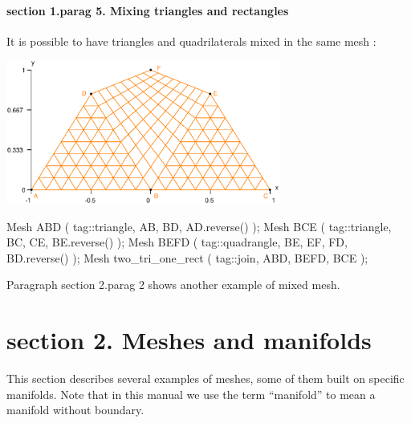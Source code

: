 \paragraph{\numb section 1.\numb parag 5. Mixing triangles and rectangles}

It is possible to have triangles and quadrilaterals mixed in the same mesh :

{ 
\centerline{\includegraphics[width=9cm]{two-tri-one-rect.eps}} }

\verbatim
   Mesh ABD ( tag::triangle, AB, BD, AD.reverse() );
   Mesh BCE ( tag::triangle, BC, CE, BE.reverse() );
   Mesh BEFD ( tag::quadrangle, BE, EF, FD, BD.reverse() );
   Mesh two_tri_one_rect ( tag::join, ABD, BEFD, BCE );
\endverbatim

Paragraph \numb section 2.\numb parag 2 shows another example of mixed mesh.





\section{\numb section 2. Meshes and manifolds}

This section describes several examples of meshes, some of them built on specific manifolds.
Note that in this manual we use the term ``manifold'' to mean a manifold without boundary.

